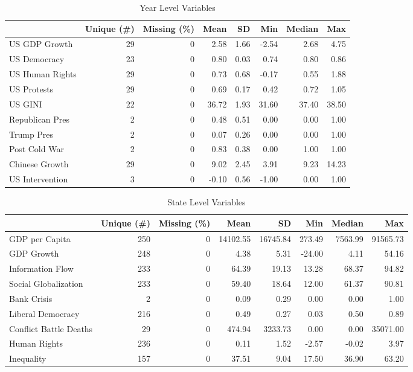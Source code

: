 \documentclass[12pt]{article}
\begin{document}
 
\begin{table}
\caption{\label{tab:year-vars}Year Level Variables}
\centering
\begin{tabular}[t]{lrrrrrrr}
\toprule
  & Unique (\#) & Missing (\%) & Mean & SD & Min & Median & Max\\
\midrule
US GDP Growth & 29 & 0 & 2.58 & 1.66 & -2.54 & 2.68 & 4.75\\
US Democracy & 23 & 0 & 0.80 & 0.03 & 0.74 & 0.80 & 0.86\\
US Human Rights & 29 & 0 & 0.73 & 0.68 & -0.17 & 0.55 & 1.88\\
US Protests & 29 & 0 & 0.69 & 0.17 & 0.42 & 0.72 & 1.05\\
US GINI & 22 & 0 & 36.72 & 1.93 & 31.60 & 37.40 & 38.50\\
Republican Pres & 2 & 0 & 0.48 & 0.51 & 0.00 & 0.00 & 1.00\\
Trump Pres & 2 & 0 & 0.07 & 0.26 & 0.00 & 0.00 & 1.00\\
Post Cold War & 2 & 0 & 0.83 & 0.38 & 0.00 & 1.00 & 1.00\\
Chinese Growth & 29 & 0 & 9.02 & 2.45 & 3.91 & 9.23 & 14.23\\
US Intervention & 3 & 0 & -0.10 & 0.56 & -1.00 & 0.00 & 1.00\\
\bottomrule
\end{tabular}
\end{table}



\begin{table}
\caption{\label{tab:state-vars}State Level Variables}
\centering
\begin{tabular}[t]{lrrrrrrr}
\toprule
  & Unique (\#) & Missing (\%) & Mean & SD & Min & Median & Max\\
\midrule
GDP per Capita & 250 & 0 & 14102.55 & 16745.84 & 273.49 & 7563.99 & 91565.73\\
GDP Growth & 248 & 0 & 4.38 & 5.31 & -24.00 & 4.11 & 54.16\\
Information Flow & 233 & 0 & 64.39 & 19.13 & 13.28 & 68.37 & 94.82\\
Social Globalization & 233 & 0 & 59.40 & 18.64 & 12.00 & 61.37 & 90.81\\
Bank Crisis & 2 & 0 & 0.09 & 0.29 & 0.00 & 0.00 & 1.00\\
Liberal Democracy & 216 & 0 & 0.49 & 0.27 & 0.03 & 0.50 & 0.89\\
Conflict Battle Deaths & 29 & 0 & 474.94 & 3233.73 & 0.00 & 0.00 & 35071.00\\
Human Rights & 236 & 0 & 0.11 & 1.52 & -2.57 & -0.02 & 3.97\\
Inequality & 157 & 0 & 37.51 & 9.04 & 17.50 & 36.90 & 63.20\\
\bottomrule
\end{tabular}
\end{table}
\end{document}
